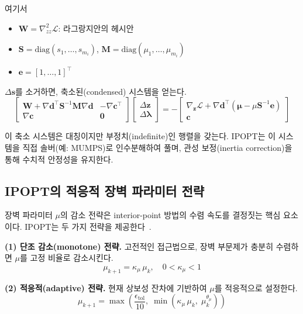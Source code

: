 \documentclass[11pt]{article}
\begin{document}
여기서

\begin{itemize}[leftmargin=*]
  \item $\mathbf{W} = \nabla^2_{zz} \mathcal{L}$: 라그랑지안의 헤시안
  \item $\mathbf{S} = \text{diag}(s_1, \ldots, s_{m_i})$, $\mathbf{M} = \text{diag}(\mu_1, \ldots, \mu_{m_i})$
  \item $\mathbf{e} = [1, \ldots, 1]^\top$
\end{itemize}

$\Delta \mathbf{s}$를 소거하면, 축소된(condensed) 시스템을 얻는다.
%
\begin{equation}\label{eq:newton-condensed}
\begin{bmatrix}
\mathbf{W} + \nabla \mathbf{d}^\top \mathbf{S}^{-1} \mathbf{M} \nabla \mathbf{d} & -\nabla \mathbf{c}^\top \\
\nabla \mathbf{c} & \mathbf{0}
\end{bmatrix}
\begin{bmatrix}
\Delta \mathbf{z} \\
\Delta \boldsymbol{\lambda}
\end{bmatrix}
= -
\begin{bmatrix}
\nabla_\mathbf{z} \mathcal{L} + \nabla \mathbf{d}^\top (\boldsymbol{\mu} - \mu \mathbf{S}^{-1} \mathbf{e}) \\
\mathbf{c}
\end{bmatrix}
\end{equation}

이 축소 시스템은 대칭이지만 부정치(indefinite)인 행렬을 갖는다. IPOPT는 이 시스템을 직접 솔버(예: MUMPS)로 인수분해하여 풀며, 관성 보정(inertia correction)을 통해 수치적 안정성을 유지한다.

\subsection{IPOPT의 적응적 장벽 파라미터 전략}

장벽 파라미터 $\mu$의 감소 전략은 interior-point 방법의 수렴 속도를 결정짓는 핵심 요소이다. IPOPT는 두 가지 전략을 제공한다~\cite{Wachter2006}.

\textbf{(1) 단조 감소(monotone) 전략.} 고전적인 접근법으로, 장벽 부문제가 충분히 수렴하면 $\mu$를 고정 비율로 감소시킨다.
%
\begin{equation}\label{eq:mu-monotone}
\mu_{k+1} = \kappa_\mu \, \mu_k, \quad 0 < \kappa_\mu < 1
\end{equation}

\textbf{(2) 적응적(adaptive) 전략.} 현재 상보성 잔차에 기반하여 $\mu$를 적응적으로 설정한다.
%
\begin{equation}\label{eq:mu-adaptive}
\mu_{k+1} = \max\left(\frac{\epsilon_{\text{tol}}}{10},\; \min\left(\kappa_\mu \, \mu_k,\; \mu_k^{\theta_\mu}\right)\right)
\end{equation}
\end{document}
